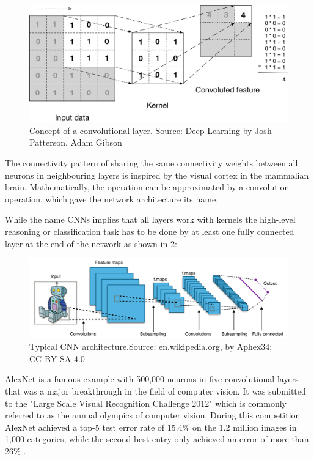 \begin{figure}[h]
    \centering
	\includegraphics[width=.8\textwidth]{./images/illustrations/cnn}
    \caption{Concept of a convolutional layer. Source: Deep Learning by Josh Patterson, Adam Gibson}
    \label{fig:cnn}
\end{figure}


The connectivity pattern of sharing the same connectivity weights between all neurons in neighbouring layers is inspired by the visual cortex in the mammalian brain.
Mathematically, the operation can be approximated by a convolution operation, which gave the network architecture its name. 

While the name CNNs implies that all layers work with kernels the high-level reasoning or classification task has to be done by at least one fully connected layer at the end of the network as shown in \ref{fig:typical-cnn}:


\begin{figure}[h]
    \centering
	\includegraphics[width=.95\textwidth]{./images/illustrations/typical-cnn}
    \caption{Typical CNN architecture.\newline Source: \url{en.wikipedia.org}, by Aphex34; CC-BY-SA 4.0}
    \label{fig:typical-cnn}
\end{figure}


AlexNet is a famous example with 500,000 neurons in five convolutional layers \cite{AlexNet} that was a major breakthrough in the field of computer vision. It was submitted to the "Large Scale Visual Recognition Challenge 2012" which is commonly referred to as the annual olympics of computer vision.
During this competition AlexNet achieved a top-5 test error rate of 15.4\% on the 1.2 million images in 1,000 categories, while the second best entry only achieved an error of more than 26\% \cite{ILSVRC15}. 


